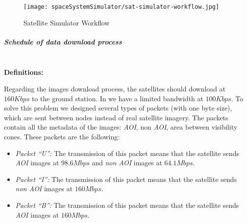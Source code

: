\begin{figure}[!h]
\begin{center}
\texttt{[image: spaceSystemSimulator/sat-simulator-workflow.jpg]}
\caption{Satellite Simulator Workflow}
\label{fig:sss-sat-simulator-workflow}
\end{center}
\end{figure}

\subparagraph{Schedule of data download process}
\label{subpar:shedule-process}~\\

\textbf{Definitions:}

Regarding the images download process, the satellites should download at
$160Kbps$ to the ground station. In \vw we have a limited bandwidth at
$100Kbps$. To solve this problem we designed several types of packets (with one
byte size), which are sent between \vw nodes instead of real satellite
imagery. The packets contain all the metadata of the images: \emph{AOI}, non \emph{AOI}, area
between visibility cones.  These packets are the following:
\begin{itemize}
\item \emph{Packet ``U'':} The transmission of this packet means that the satellite sends \emph{AOI} images at $98.6 Mbps$ and \emph{non AOI} images at $64.1Mbps$.
\item \emph{Packet ``I'':} The transmission of this packet means that the satellite sends \emph{non AOI} images at $160 Mbps$.
\item \emph{Packet ``B'':} The transmission of this packet means that the
  satellite sends \emph{AOI} images at $160 Mbps$.
\end{itemize}

